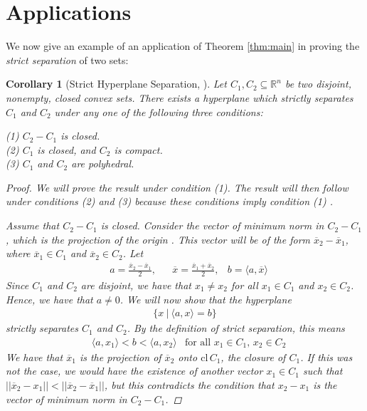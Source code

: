 \documentclass[11pt,reqno]{amsart}
\newcommand{\R}{\mathbb{R}}
\newcommand{\cl}{\mathrm{cl\,}}
\theoremstyle{plain}
\newtheorem{corollary}[theorem]{Corollary}
\theoremstyle{definition}
\begin{document}
\section{Applications}
\label{sec:applications}
{
\setlength{\parskip}{8pt}
We now give an example of an application of Theorem \ref{thm:main}  in proving the \emph{strict separation} of two sets:
\begin{corollary}[{Strict Hyperplane Separation, \cite[1.5.3]{bertsekas2009convex}}]
    Let $C_1,C_2\subseteq\R^n$ be two disjoint, nonempty, closed convex sets. There exists a hyperplane which strictly separates $C_1$ and $C_2$ under any one of the following three conditions:
    
    \onehalfspacing
    (1) $C_2 - C_1$ is closed.\\
    (2) $C_1$ is closed, and $C_2$ is compact.\\
    (3) $C_1$ and $C_2$ are polyhedral.
    \singlespacing
    \begin{proof}
        We will prove the result under condition (1). The result will then follow under conditions (2) and (3) because these conditions imply condition (1) \cite[1.4.14]{bertsekas2009convex}.

        Assume that $C_2-C_1$ is closed. Consider the vector of minimum norm in $C_2-C_1$, which is the projection of the origin \cite[1.1.9]{bertsekas2009convex}. This vector will be of the form $\overline{x}_2 - \overline{x}_1$, where $\overline{x}_1\in C_1$ and $\overline{x}_2\in C_2$. Let
        \begin{align*}
            &a = \frac{\overline{x}_2 - \overline{x}_1}{2},& &\overline{x} =  \frac{\overline{x}_1 + \overline{x}_2}{2}, &b=\langle a,\overline{x}\rangle
        \end{align*}
        Since $C_1$ and $C_2$ are disjoint, we have that $x_1\neq x_2$ for all $x_1\in C_1$ and $x_2\in C_2$. Hence, we have that $a\neq 0$. We will now show that the hyperplane
        \begin{align*}
            \{x\ |\ \langle a,x\rangle = b\}
        \end{align*}
        strictly separates $C_1$ and $C_2$. By the definition of strict separation, this means
        \begin{align*}
            &\langle a,x_1\rangle < b < \langle a,x_2\rangle &\text{for all $x_1\in C_1$, $x_2\in C_2$}
        \end{align*}
        We have that $\overline{x}_1$ is the projection of $\overline{x}_2$ onto $\cl C_1$, the closure of $C_1$. If this was not the case, we would have the existence of another vector $x_1\in C_1$ such that $||\overline{x}_2 - x_1|| < ||\overline{x}_2 - \overline{x}_1||$, but this contradicts the condition that $x_2 - x_1$ is the vector of minimum norm in $C_2 - C_1$.


\end{proof}
\end{corollary}}
\end{document}
